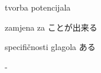 
\author{Tomislav Mamić}

	
	
	\begin{hyou}
		\item tvorba potencijala
		\item zamjena za ことが出来る
		\item specifičnosti glagola ある
	\end{hyou}
	
	
	\begin{hyou}
		\item -
	\end{hyou}
